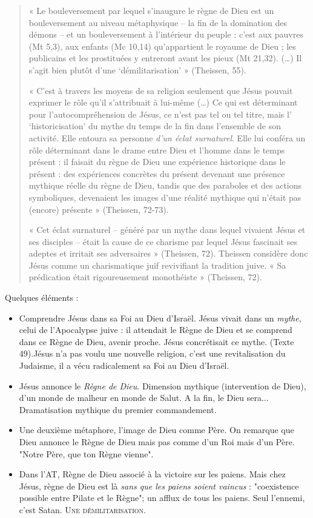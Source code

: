 \begin{quote}
« Le bouleversement par lequel s'inaugure le règne de Dieu est un
bouleversement au niveau métaphysique -- la fin de la domination des
démons -- et un bouleversement à l'intérieur du peuple : c'est aux
pauvres (Mt 5,3), aux enfants (Mc 10,14) qu'appartient le royaume de
Dieu ; les publicains et les prostituées y entreront avant les pieux (Mt
21,32). (\ldots) Il s'agit bien plutôt d'une `démilitarisation' »
(Theissen, 55).

« C'est à travers les moyens de sa religion seulement que Jésus pouvait
exprimer le rôle qu'il s'attribuait à lui-même (\ldots) Ce qui est
déterminant pour l'autocompréhension de Jésus, ce n'est pas tel ou tel
titre, mais l' `historicisation' du mythe du temps de la fin dans
l'ensemble de son activité. Elle entoura sa personne \emph{d'un éclat
surnaturel}. Elle lui conféra un rôle déterminant dans le drame entre
Dieu et l'homme dans le temps présent : il faisait du règne de Dieu une
expérience historique dans le  présent : des expériences concrètes du présent devenant une présence
mythique réelle du règne de Dieu, tandis que des paraboles et des
actions symboliques, devenaient les images d'une réalité mythique qui
n'était pas (encore) présente » (Theissen, 72-73).

« Cet éclat surnaturel -- généré par un mythe dans lequel vivaient Jésus
et ses disciples -- était la cause de ce charisme par lequel Jésus
fascinait ses adeptes et irritait ses adversaires » (Theissen, 72).
Theissen considère donc Jésus comme un charismatique juif revivifiant la
tradition juive. « Sa prédication était rigoureusement monothéiste »
(Theissen, 72).
\end{quote}

Quelques éléments : 
\begin{itemize}

\item Comprendre Jésus dans sa Foi au Dieu d'Israël. Jésus vivait dans un \textit{mythe}, celui de l'Apocalypse juive : il attendait le Règne de Dieu et se comprend dans ce Règne de Dieu, avenir proche.  Jésus concrétisait ce mythe. (Texte 49).Jésus n'a pas voulu une nouvelle religion, c'est une revitalisation du Judaisme, il a vécu radicalement sa Foi au Dieu d'Israël. 
\item Jésus annonce le \textit{Règne de Dieu}. Dimension mythique (intervention de Dieu), d'un monde de malheur en monde de Salut. A la fin, le Dieu sera... Dramatisation mythique du premier commandement. 
\item Une deuxième métaphore, l'image de Dieu comme Père. On remarque que Dieu annonce le Règne de Dieu mais pas comme d'un Roi mais d'un Père. "Notre Père, que ton Règne vienne". 
\item Dans l'AT, Règne de Dieu associé à la victoire sur les paiens. Mais chez Jésus, règne de Dieu est là \textit{sans que les paiens soient vaincus} : "coexistence possible entre Pilate et le Règne"; un afflux de tous les paiens. Seul l'ennemi, c'est Satan. \textsc{Une démilitarisation}.
 
\end{itemize}


